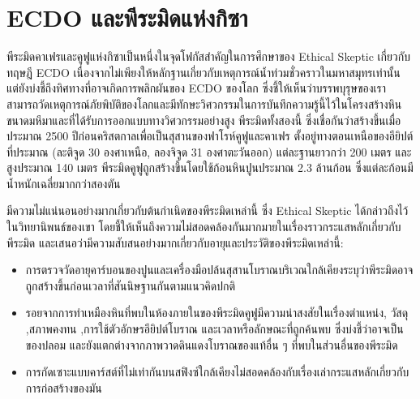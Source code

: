\documentclass[10pt,twocolumn,letterpaper]{article}
\begin{document}
\section{ECDO และพีระมิดแห่งกิซา}

พีระมิดคาเฟรและคูฟูแห่งกิซาเป็นหนึ่งในจุดโฟกัสสำคัญในการศึกษาของ Ethical Skeptic เกี่ยวกับทฤษฎี ECDO \cite{27} เนื่องจากไม่เพียงให้หลักฐานเกี่ยวกับเหตุการณ์น้ำท่วมชั่วคราวในมหาสมุทรเท่านั้น แต่ยังบ่งชี้ถึงทิศทางที่อาจเกิดการพลิกผันของ ECDO ของโลก ซึ่งชี้ให้เห็นว่าบรรพบุรุษของเราสามารถวัดเหตุการณ์ภัยพิบัติของโลกและมีทักษะวิศวกรรมในการบันทึกความรู้นี้ไว้ในโครงสร้างหินขนาดมหึมาและที่ได้รับการออกแบบทางวิศวกรรมอย่างสูง พีระมิดทั้งสองนี้ ซึ่งเชื่อกันว่าสร้างขึ้นเมื่อประมาณ 2500 ปีก่อนคริสตกาลเพื่อเป็นสุสานของฟาโรห์คูฟูและคาเฟร ตั้งอยู่ทางตอนเหนือของอียิปต์ที่ประมาณ (ละติจูด 30 องศาเหนือ, ลองจิจูด 31 องศาตะวันออก) แต่ละฐานยาวกว่า 200 เมตร และสูงประมาณ 140 เมตร พีระมิดคูฟูถูกสร้างขึ้นโดยใช้ก้อนหินปูนประมาณ 2.3 ล้านก้อน ซึ่งแต่ละก้อนมีน้ำหนักเฉลี่ยมากกว่าสองตัน \cite{24, 25}

มีความไม่แน่นอนอย่างมากเกี่ยวกับต้นกำเนิดของพีระมิดเหล่านี้ ซึ่ง Ethical Skeptic ได้กล่าวถึงไว้ในวิทยานิพนธ์ของเขา โดยชี้ให้เห็นถึงความไม่สอดคล้องกันมากมายในเรื่องราวกระแสหลักเกี่ยวกับพีระมิด และเสนอว่ามีความสับสนอย่างมากเกี่ยวกับอายุและประวัติของพีระมิดเหล่านี้:

\begin{flushleft}
\begin{itemize}
    \item การตรวจวัดอายุคาร์บอนของปูนและเครื่องมือปล้นสุสานโบราณบริเวณใกล้เคียงระบุว่าพีระมิดอาจถูกสร้างขึ้นก่อนเวลาที่สันนิษฐานกันตามแนวคิดปกติ
    \item  รอยจากการทำเหมืองหินที่พบในห้องภายในของพีระมิดคูฟูมีความน่าสงสัยในเรื่องตำแหน่ง, วัสดุ ,สภาพคงทน ,การใช้ตัวอักษรอียิปต์โบราณ และเวลาหรือลักษณะที่ถูกค้นพบ ซึ่งบ่งชี้ว่าอาจเป็นของปลอม และยังแตกต่างจากภาพวาดดินแดงโบราณของแท้อื่น ๆ ที่พบในส่วนอื่นของพีระมิด
    \item การกัดเซาะแบบคาร์สต์ที่ไม่เท่ากันบนสฟิงซ์ใกล้เคียงไม่สอดคล้องกับเรื่องเล่ากระแสหลักเกี่ยวกับการก่อสร้างของมัน
\end{itemize}
\end{flushleft}
\end{document}
